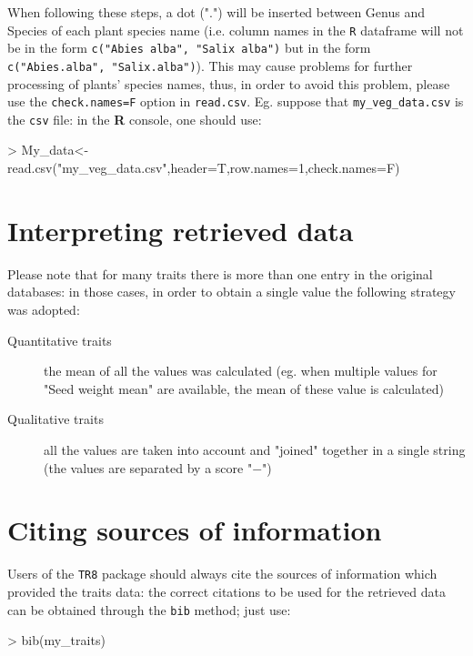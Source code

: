 \documentclass{article}
\begin{document}
  When following these steps, a dot (".") will be inserted between
Genus and Species of each plant species name (i.e. column names in the
\texttt{R} dataframe will not be in the form \texttt{c("Abies alba", "Salix
alba")} but in the form  \texttt{c("Abies.alba", "Salix.alba")}).
This may cause problems for further processing of plants'
species names, thus, in order to avoid this problem, please use the \texttt{check.names=F}
  option in \texttt{read.csv}. Eg. suppose that
  \texttt{my\_veg\_data.csv} is the \texttt{csv} file: in the
  \textbf{R} console, one should use:

\begin{Schunk}
\begin{Sinput}
> My_data<-read.csv("my_veg_data.csv",header=T,row.names=1,check.names=F)
\end{Sinput}
\end{Schunk}


\section{Interpreting retrieved data}
\label{sec:interpreting}

Please note that for many traits there is more than one entry in the
original databases: in those cases, in order to obtain a single value
the following strategy was adopted:

\begin{description}
\item[Quantitative traits] the mean of all the values was calculated
  (eg. when multiple values for "Seed weight mean" are available, the
  mean of these value is calculated)
\item[Qualitative traits] all the values are taken into account and
  "joined" together in a single string (the values are separated by a
  score "$-$")
\end{description}
\section{Citing sources of information}
\label{sec:citing}

  Users of the \texttt{TR8} package should always cite the sources of information which provided the traits data: the correct citations to be used for the retrieved data can be obtained through the \texttt{bib} method; just use:
  

\begin{Schunk}
\begin{Sinput}
> bib(my_traits)
\end{Sinput}
\end{Schunk}
\end{document}
